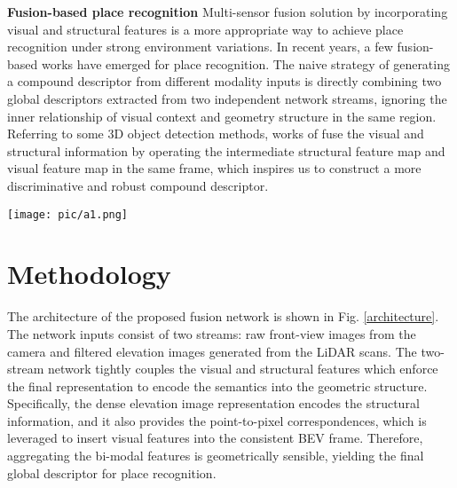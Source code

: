 \documentclass[letterpaper, 10 pt, conference]{ieeeconf}  \usepackage{tabularx}
\begin{document}
\textbf{Fusion-based place recognition} Multi-sensor fusion solution by incorporating visual and structural features is a more appropriate way to achieve place recognition under strong environment variations. In recent years, a few fusion-based works have emerged for place recognition. The naive strategy \cite{xie2020large, oertel2020augmenting} of generating a compound descriptor from different modality inputs is directly combining two global descriptors extracted from two independent network streams, ignoring the inner relationship of visual context and geometry structure in the same region. Referring to some 3D object detection methods, works of \cite{wang2018fusing, liang2018deep} fuse the visual and structural information by operating the intermediate structural feature map and visual feature map in the same frame, which inspires us to construct a more discriminative and robust compound descriptor.  

\begin{figure*}[tp]
	\centering
	\vspace{3mm}
	\texttt{[image: pic/a1.png]}

	\caption{The network architecture of CORAL-VLAD. The network inputs an elevation image generated by LiDAR scans and a visual image, and then outputs a global descriptor to predict the most similar scene on the reference database. $A$ shows multi-scale visual feature map from the output of FPN layer, $B$ shows the BEV visual feature map from the ouput of projection layer.}
	\label{architecture}
	\vspace{-10pt}
\end{figure*}

\section{Methodology}

The architecture of the proposed fusion network is shown in Fig. \ref{architecture}. The network inputs consist of two streams: raw front-view images from the camera and filtered elevation images generated from the LiDAR scans. The two-stream network tightly couples the visual and structural features which enforce the final representation to encode the semantics into the geometric structure. Specifically, the dense elevation image representation encodes the structural information, and it also provides the point-to-pixel correspondences, which is leveraged to insert visual features into the consistent BEV frame. Therefore, aggregating the bi-modal features is geometrically sensible, yielding the final global descriptor for place recognition.
\end{document}
